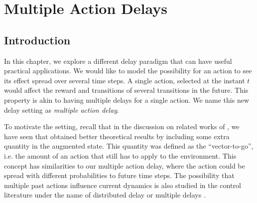 \chapter{Multiple Action Delays}
\label{chap:multi_action_delay}


\section{Introduction}

In this chapter, we explore a different delay paradigm that can have useful practical applications. 
We would like to model the possibility for an action to see its effect spread over several time steps.
A single action, selected at the instant $t$ would affect the reward and transitions of several transitions in the future.
This property is akin to having multiple delays for a single action.
We name this new delay setting as \emph{multiple action delay}.

To motivate the setting, recall that in the discussion on related works of , we have seen that \cite{xiao2020thinking} obtained better theoretical results by including some extra quantity in the augmented state. 
This quantity was defined as the ``vector-to-go'', i.e. the amount of an action that still has to apply to the environment. 
This concept has similarities to our multiple action delay, where the action could be spread with different probabilities to future time steps. 
The possibility that multiple past actions influence current dynamics is also studied in the control literature under the name of distributed delay or multiple delays \cite{gu2003survey,richard2003time}.

